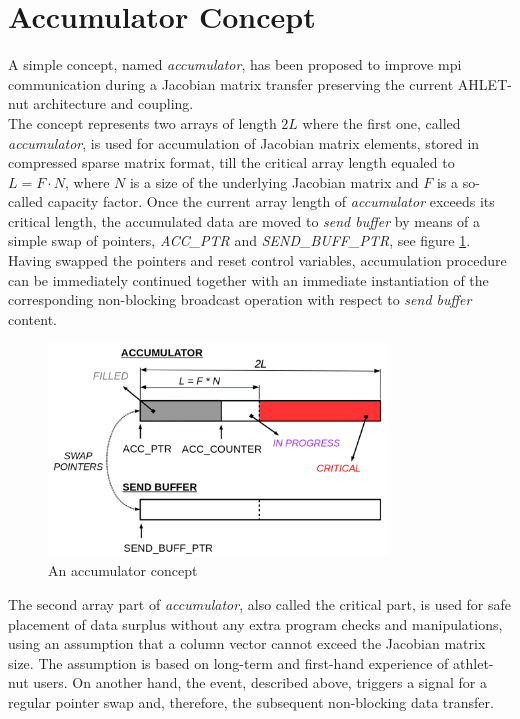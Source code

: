 \section{Accumulator Concept}
\label{sec:accumulator-approach}



A simple concept, named \textit{accumulator}, has been proposed to improve \acrshort{mpi} communication during a Jacobian matrix transfer preserving the current AHLET-\acrshort{nut} architecture and coupling.\\


The concept represents two arrays of length $2L$ where the first one, called \textit{accumulator}, is used for accumulation of Jacobian matrix elements, stored in compressed sparse matrix format, till the critical array length equaled to $L = F \cdot N$, where $N$ is a size of the underlying Jacobian matrix and $F$ is a so-called capacity factor. Once the current array length of \textit{accumulator} exceeds its critical length, the accumulated data are moved to \textit{send buffer} by means of a simple swap of pointers, \textit{ACC\_PTR} and \textit{SEND\_BUFF\_PTR}, see figure \ref{fig:accumulator-concept}. Having swapped the pointers and reset control variables, accumulation procedure can be immediately continued together with an immediate instantiation of the corresponding non-blocking broadcast operation with respect to \textit{send buffer} content.\\


\begin{figure}[htpb]
  \centering
  \includegraphics[width=0.8\textwidth]{figures/chapter-3/accumulator-concept.png}
  \caption{An accumulator concept} \label{fig:accumulator-concept}
\end{figure}


The second array part of \textit{accumulator}, also called the critical part, is used for safe placement of data surplus without any extra program checks and manipulations, using an assumption that a column vector cannot exceed the Jacobian matrix size. The assumption is based on long-term and first-hand experience of \acrshort{athlet}-\acrshort{nut} users. On another hand, the event, described above, triggers a signal for a regular pointer swap and, therefore, the subsequent non-blocking data transfer.\\


